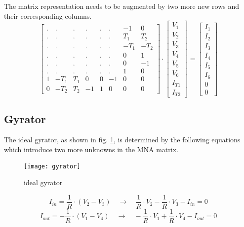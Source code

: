 \documentclass[10pt]{report}
\begin{document}
The matrix representation needs to be augmented by two more new rows
and their corresponding columns.
\begin{equation}
\begin{bmatrix}
.&.&.&.&.&.& -1 & 0\\
.&.&.&.&.&.& T_{1} & T_{2}\\
.&.&.&.&.&.& -T_{1} & -T_{2}\\
.&.&.&.&.&.& 0 & 1\\
.&.&.&.&.&.& 0 & -1\\
.&.&.&.&.&.& 1 & 0\\
1 & -T_{1} & T_{1} & 0 & 0 & -1 & 0 & 0\\
0 & -T_{2} & T_{2} & -1 & 1 & 0 & 0 & 0
\end{bmatrix}
\cdot
\begin{bmatrix}
V_{1}\\
V_{2}\\
V_{3}\\
V_{4}\\
V_{5}\\
V_{6}\\
I_{T1}\\
I_{T2}
\end{bmatrix}
=
\begin{bmatrix}
I_{1}\\
I_{2}\\
I_{3}\\
I_{4}\\
I_{5}\\
I_{6}\\
0\\
0
\end{bmatrix}
\end{equation}

\subsection{Gyrator}

The ideal gyrator, as shown in fig. \ref{fig:gyrator}, is determined
by the following equations which introduce two more unknowns in the
MNA matrix.

\begin{figure}[ht]
\begin{center}
\texttt{[image: gyrator]}
\end{center}
\caption{ideal gyrator}
\label{fig:gyrator}
\end{figure}
\FloatBarrier

\begin{equation}
I_{in} = \frac{1}{R}\cdot\left(V_{2} - V_{3}\right)
\quad \rightarrow \quad
\frac{1}{R}\cdot V_{2} - \frac{1}{R}\cdot V_{3} - I_{in} = 0
\end{equation}
\begin{equation}
I_{out} = -\frac{1}{R}\cdot\left(V_{1} - V_{4}\right)
\quad \rightarrow \quad
-\frac{1}{R}\cdot V_{1} + \frac{1}{R}\cdot V_{4} - I_{out} = 0
\label{eq:gyrator}
\end{equation}
\end{document}
